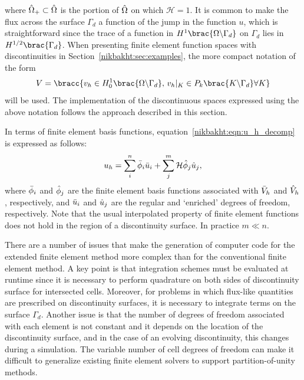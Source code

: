 %
where $\Hat{\Omega}_{+} \subset \Hat{\Omega}$ is the portion of
$\Hat{\Omega}$ on which $\mathcal{H} = 1$.  It is common to make the
flux across the surface $\Gamma_{d}$ a function of the
jump in the function $u$, which is straightforward since the trace of a
function in $H^{1}\brac{\Omega\backslash\Gamma_{d}}$ on $\Gamma_{d}$ lies
in $H^{1/2}\brac{\Gamma_{d}}$.
When presenting finite element function spaces
with discontinuities in Section~\ref{nikbakht:sec:examples}, the more compact
notation of the form
%
\begin{equation}
  V = \bracc{v_{h} \in H_{0}^{1}\brac{\Omega \backslash \Gamma_{d}}, \,
          v_{h}|_{K} \in P_{k}\brac{K \backslash \Gamma_{d}} \forall K}
\end{equation}
%
will be used. The implementation of the discontinuous spaces expressed
using the above notation follows the approach described in this section.

In terms of finite element basis functions,
equation~\eqref{nikbakht:eqn:u_h_decomp} is expressed as follows:
%
\begin{equation}
  u_{h} = \sum_{i}^{n} \Bar{\phi}_{i} \Bar{u}_{i}
    + \sum_{j}^{m} \mathcal{H} \Hat{\phi}_{j} \Hat{u}_{j},
\label{nikbakht:eqn:basis_decomp}
\end{equation}
%
where $\Bar{\phi}_{i}$ and $\Hat{\phi}_{j}$ are the finite element basis
functions associated with $\Bar{V}_{h}$ and $\Hat{V}_{h}$, respectively,
and $\Bar{u}_{i}$ and $\Hat{u}_{j}$ are the regular and `enriched' degrees
of freedom, respectively. Note that the usual interpolated property
of finite element functions does not hold in the region of a discontinuity
surface. In practice $m \ll n$.

There are a number of issues that make the generation of computer code for
the extended finite element method more complex than for the conventional
finite element method.  A key point is that integration schemes must
be evaluated at runtime since it is necessary to perform quadrature on
both sides of discontinuity surface for intersected cells.  Moreover,
for problems in which flux-like quantities are prescribed on discontinuity
surfaces, it is necessary to integrate terms on the surface $\Gamma_{d}$.
Another issue is that the number of degrees of freedom associated with
each element is not constant and it depends on the location of the
discontinuity surface, and in the case of an evolving discontinuity,
this changes during a simulation.  The variable number of cell degrees
of freedom can make it difficult to generalize existing finite element
solvers to support partition-of-unity methods.

